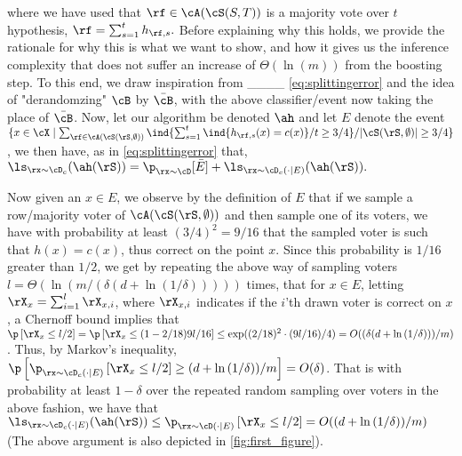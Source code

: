   \vspace{-0.4cm}\newline
where we have used that $\rf\in  \cA(\cS(S,T)) $ is a majority vote over $ t $ hypothesis, $ \rf=\sum_{s=1}^{t} h_{\rf,s}.$     
Before explaining why this holds, we provide the rationale for why this is what we want to show, and how it gives us the inference complexity that does not suffer an increase of $ \Theta(\ln{(m )}) $  from the boosting step. To this end, we draw inspiration from ____ \cref{eq:splittingerror} and the idea of "derandomzing" $ \cB $ by $ \bar{\cB} $, with the above classifier/event now taking the place of $ \bar{\cB} $. Now, let our algorithm be denoted $ \ah $ and let $ E $ denote the event $ \{x\in \cX \mid  \sum_{\rf\in \cA(\cS(\rS,\emptyset))} \ind\{\sum_{s=1}^{t} \ind\{h_{\rf,s}(x)=c(x)\}/t\geq 3/4\}/|\cS(\rS,\emptyset)|
\geq 3/4 \}$, we then have,  as in \cref{eq:splittingerror} that,
$\ls_{\rx\sim\cD_{c}}(\ah(\rS)) = \p_{\rx\sim\cD}[\bar{E}]+\ls_{\rx\sim\cD_{c}(\cdot \mid E)}(\ah(\rS)).$

Now given an $ x\in E $, we observe by the definition of $ E $ that if we sample a row/majority voter of $ \cA(\cS(\rS,\emptyset)) $ and then sample one of its voters, we have with probability at least $ (3/4)^{2}=9/16 $ that the sampled voter is such that $ h(x)=c(x) $, thus correct on the point $ x $. Since this probability is $1/16 $ greater than $ 1/2 $,  we get by repeating the above way of sampling voters $l= \Theta(\ln{\left(m/(\delta(d+\ln{\left(1/\delta \right)})) \right)} )$ times, that for $ x\in E $, letting $ \rX_{x}=\sum_{i=1}^{l}\rX_{x,i} $, where $ \rX_{x,i} $ indicates if the $ i $'th drawn voter is correct on $ x $, a Chernoff bound implies that $\p\left[\rX_{x}\leq l/2\right]= \p\left[\rX_{x}\leq (1-2/18)9l/16\right]\leq \exp((2/18)^{2}\cdot(9l/16)/4)=O((\delta(d+\ln{\left(1/\delta \right)}))/m )$. Thus, by Markov's inequality, $ \p\left[\p_{\rx\sim\cD_{c}(\cdot\mid E)}\left[\rX_{x}\leq l/2\right]\geq (d+\ln{\left(1/\delta \right)})/m \right]=O(\delta)$. That is with probability at least $ 1-\delta $ over the repeated random sampling over voters in the above fashion, we have that $\ls_{\rx\sim\cD_{c}(\cdot \mid E)}(\ah(\rS))\leq \p_{\rx\sim\cD(\cdot|E)}\left[\rX_{x}\leq l/2\right]=O((d+\ln{\left(1/\delta \right)})/m)  $ (The above argument is also depicted in \cref{fig:first_figure}). 

